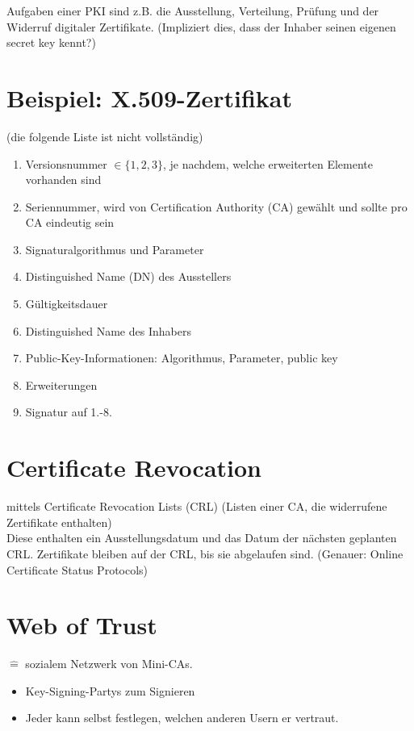 \documentclass[a4paper,twoside,DIV15,BCOR12mm]{scrbook}
\begin{document}
Aufgaben einer PKI sind z.B. die Ausstellung, Verteilung, Prüfung und der Widerruf digitaler Zertifikate. (Impliziert dies, dass der Inhaber seinen eigenen secret key kennt?)

\section{Beispiel: X.509-Zertifikat}

(die folgende Liste ist nicht vollständig)

\begin{enumerate}
	\item Versionsnummer $\in \{1,2,3\}$, je nachdem, welche erweiterten Elemente vorhanden sind
	\item Seriennummer, wird von Certification Authority (CA) gewählt und sollte pro CA eindeutig sein
	\item Signaturalgorithmus und Parameter
	\item Distinguished Name (DN) des Ausstellers
	\item Gültigkeitsdauer
	\item Distinguished Name des Inhabers
	\item Public-Key-Informationen: Algorithmus, Parameter, public key
	\item Erweiterungen
	\item Signatur auf 1.-8.
\end{enumerate}

\section{Certificate Revocation}

mittels Certificate Revocation Lists (CRL) (Listen einer CA, die widerrufene Zertifikate enthalten)\\

Diese enthalten ein Ausstellungsdatum und das Datum der nächsten geplanten CRL. Zertifikate bleiben auf der CRL, bis sie abgelaufen sind. (Genauer: Online Certificate Status Protocols)

\section{Web of Trust}

$\mathrel{\widehat{=}}$ sozialem Netzwerk von \glqq Mini-CAs\grqq.

\begin{itemize}
	\item Key-Signing-Partys zum Signieren
	\item Jeder kann selbst festlegen, welchen anderen Usern er vertraut.
\end{itemize}
\end{document}
